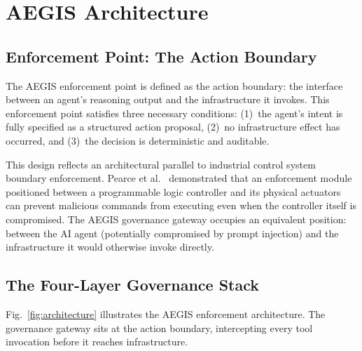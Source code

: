 \documentclass[journal]{IEEEtran}
\begin{document}
\section{AEGIS Architecture}

\subsection{Enforcement Point: The Action Boundary}

The AEGIS enforcement point is defined as the action boundary: the interface between an agent's reasoning output and the infrastructure it invokes. This enforcement point satisfies three necessary conditions: (1)~the agent's intent is fully specified as a structured action proposal, (2)~no infrastructure effect has occurred, and (3)~the decision is deterministic and auditable.

This design reflects an architectural parallel to industrial control system boundary enforcement. Pearce et al.~\cite{pearce2020} demonstrated that an enforcement module positioned between a programmable logic controller and its physical actuators can prevent malicious commands from executing even when the controller itself is compromised. The AEGIS governance gateway occupies an equivalent position: between the AI agent (potentially compromised by prompt injection) and the infrastructure it would otherwise invoke directly.

\subsection{The Four-Layer Governance Stack}

Fig.~\ref{fig:architecture} illustrates the AEGIS enforcement architecture. The governance gateway sits at the action boundary, intercepting every tool invocation before it reaches infrastructure.
\end{document}
